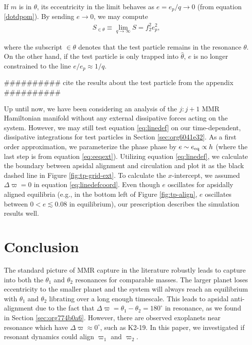 \documentclass[usenatbib,twocolumn]{mnras}
\begin{document}
\noindent
If \(m\) is in \(\theta\), its eccentricity
in the limit behaves as \(e=e_p/q\to0\) (from equation \eqref{dotdpom}).
By sending \(e\to0\), we may compute
\begin{align}
S_{\in\theta}  \equiv \lim_{q\to\infty} S = f_2^2e_p^2, 
\end{align}

\noindent where the subscript \(\in\theta\) denotes that the
test particle remains in the resonance \(\theta\).  On the other hand,
if the test particle is only trapped into \(\hat\theta\), \(e\) is no longer
constrained to the line \(e/e_p \approx 1/q\).

\#\#\#\#\#\#\#\#\#\#
cite the results about the test particle from the appendix
\#\#\#\#\#\#\#\#\#\#

Up until now, we have been considering an analysis of the \(j:j+1\) MMR
Hamiltonian manifold without any external dissipative forces acting on
the system. However, we may still test equation \eqref{eq:linedef} on
our time-dependent, dissipative integrations for test particles in
Section \ref{sec:org6041e32}.  As a first order approximation, we
parameterize the phase phase by \(e\sim e_{\rm eq}
\propto h\) (where the last step is from equation \eqref{eq:eeqext}).
Utilizing equation \eqref{eq:linedef}, we calculate the boundary between
apsidal alignment and circulation and plot it as the black dashed line
in Figure \ref{fig:tp-grid-ext}.  To calculate the $x$-intercept, we
assumed \(\Delta\varpi=0\) in equation \eqref{eq:linedefcoord}.  Even though \(e\) oscillates for apsidally
aligned equilibria (e.g., in the bottom left of Figure
\ref{fig:tp-align}, \(e\) oscillates between \(0<e\lesssim 0.08\) in
equilibrium), our prescription describes the simulation results well.

\section{Conclusion}
\label{sec:org8345486}
The standard picture of MMR capture in the literature robustly leads
to capture into both the \(\theta_1\) and \(\theta_2\) resonances for
comparable masses.  The larger planet loses eccentricity to the
smaller planet and the system will always reach an equilibrium with
\(\theta_1\) and \(\theta_2\) librating over a long enough timescale.
This leads to apsidal anti-alignment due to the fact that
\(\Delta\varpi=\theta_1-\theta_2=180^\circ\) in resonance, as we found
in Section \ref{sec:org774b0a6}.  However, there are
observed exoplanets near resonance which have
\(\Delta\varpi\approx0^\circ\), such as K2-19.  In this paper, we
investigated if resonant dynamics could align \(\varpi_1\) and
\(\varpi_2\).
\end{document}
